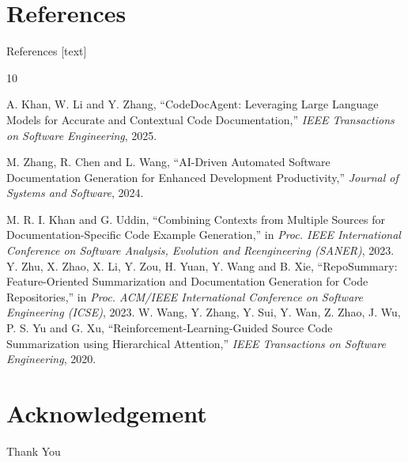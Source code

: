 \documentclass{beamer}
\begin{document}
\section{References}
    \begin{frame}[allowframebreaks]{References}
    [text]
     \begin{thebibliography}{10}
  

\justifying
{}
A. Khan, W. Li and Y. Zhang,
``CodeDocAgent: Leveraging Large Language Models for Accurate and Contextual Code Documentation,''
\emph{IEEE Transactions on Software Engineering},
 2025.

M. Zhang, R. Chen and L. Wang,
``AI-Driven Automated Software Documentation Generation for Enhanced Development Productivity,''
\emph{Journal of Systems and Software},
 2024.

M. R. I. Khan and G. Uddin,
``Combining Contexts from Multiple Sources for Documentation-Specific Code Example Generation,''
in \emph{Proc. IEEE International Conference on Software Analysis, Evolution and Reengineering (SANER)},
2023.
Y. Zhu, X. Zhao, X. Li, Y. Zou, H. Yuan, Y. Wang and B. Xie,
``RepoSummary: Feature-Oriented Summarization and Documentation Generation for Code Repositories,''
in \emph{Proc. ACM/IEEE International Conference on Software Engineering (ICSE)},
2023.
W. Wang, Y. Zhang, Y. Sui, Y. Wan, Z. Zhao, J. Wu, P. S. Yu and G. Xu,
``Reinforcement-Learning-Guided Source Code Summarization using Hierarchical Attention,''
\emph{IEEE Transactions on Software Engineering},
 2020.




 \end{thebibliography}
\end{frame}

    



\section{Acknowledgement}  
\begin{frame}

\vspace{10pt}
\huge{\centerline{Thank You}}



\end{frame}
\end{document}
